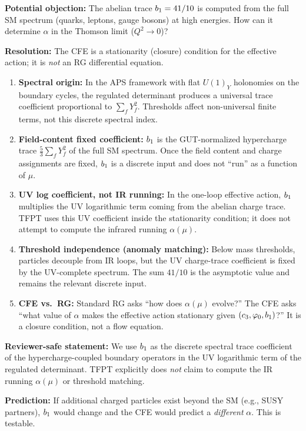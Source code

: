 \begin{tcolorbox}[colback=yellow!3, colframe=yellow!50!black, 
    title={\textbf{Scale Consistency: Why $\bone$ (UV) Determines $\alpha$ (IR)}}, fonttitle=\bfseries\small]
\textbf{Potential objection:} The abelian trace $b_1 = 41/10$ is computed from the full SM spectrum 
(quarks, leptons, gauge bosons) at high energies. How can it determine $\alpha$ in the Thomson 
limit ($Q^2 \to 0$)?

\textbf{Resolution:} The CFE is a stationarity (closure) condition for the effective action; it is \emph{not} an RG differential equation.

\begin{enumerate}[leftmargin=1.5em, topsep=2pt, itemsep=1pt]
    \item \textbf{Spectral origin:} In the APS framework with flat $U(1)_Y$ holonomies on the boundary cycles,
        the regulated determinant produces a universal trace coefficient proportional to $\sum_f Y_f^2$.
        Thresholds affect non-universal finite terms, not this discrete spectral index.
    \item \textbf{Field-content fixed coefficient:} $\bone$ is the GUT-normalized hypercharge trace 
        $\frac{5}{3}\sum_f Y_f^2$ of the full SM spectrum. Once the field content and charge assignments are fixed, 
        $\bone$ is a discrete input and does not ``run'' as a function of $\mu$.
    \item \textbf{UV log coefficient, not IR running:} In the one-loop effective action, $\bone$ multiplies the UV logarithmic term 
        coming from the abelian charge trace. TFPT uses this UV coefficient inside the stationarity condition; it does not attempt to compute 
        the infrared running $\alpha(\mu)$.
    \item \textbf{Threshold independence (anomaly matching):} Below mass thresholds, particles decouple from IR loops, but the UV charge-trace 
        coefficient is fixed by the UV-complete spectrum. The sum $41/10$ is the asymptotic value and remains the relevant discrete input.
    \item \textbf{CFE vs.\ RG:} Standard RG asks ``how does $\alpha(\mu)$ evolve?'' The CFE asks ``what value of $\alpha$ makes the effective action stationary 
        given $(c_3,\varphi_0,b_1)$?'' It is a closure condition, not a flow equation.
\end{enumerate}

\textbf{Reviewer-safe statement:} We use $\bone$ as the discrete spectral trace coefficient of the
hypercharge-coupled boundary operators in the UV logarithmic term of the regulated determinant.
TFPT explicitly does \emph{not} claim to compute the IR running $\alpha(\mu)$ or threshold matching.

\textbf{Prediction:} If additional charged particles exist beyond the SM (e.g., SUSY partners), 
$\bone$ would change and the CFE would predict a \emph{different} $\alpha$. This is testable.
\end{tcolorbox}

